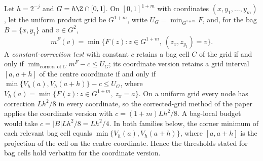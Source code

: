 Let $h=2^{-j}$ and $G=h\Z\cap[0,1]$. On $[0,1]^{1+m}$ with coordinates
$(x,y_1,\ldots,y_m)$, let the uniform product grid be $G^{1+m}$, write
$U_G=\min_{G^{1+m}}F$, and, for the bag $B=\{x,y_1\}$ and $v\in G^2$,
\[
m^F(v)=\min\{F(z):z\in G^{1+m},\ (z_x,z_{y_1})=v\}.
\]
A \emph{constant-correction test} with constant $c$ retains a bag cell
$C$ of the grid if and only if $\min_{\text{corners of }C}m^F-c\le U_G$;
its coordinate version retains a grid interval $[a,a+h]$ of the centre
coordinate if and only if $\min\{V_h(a),V_h(a+h)\}-c\le U_G$, where
$V_h(a)=\min\{F(z):z\in G^{1+m},\ z_x=a\}$. On a uniform grid every node has
correction $Lh^2/8$ in every coordinate, so the corrected-grid method of
the paper applies the coordinate version with $c=(1+m)Lh^2/8$. A bag-local
budget would take $c=|B|Lh^2/8=Lh^2/4$. In both families below, the
corner minimum of each relevant bag cell equals
$\min\{V_h(a),V_h(a+h)\}$, where $[a,a+h]$ is the projection of the cell
on the centre coordinate. Hence the thresholds stated for bag cells hold
verbatim for the coordinate version.

